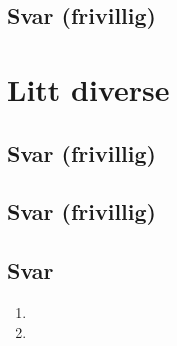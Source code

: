 \documentclass[answers,11pt]{exam}
\begin{document}
\begin{enumerate}[label=\alph*)]
  \begin{tcolorbox}
    \subsection*{Svar (frivillig)}

  \end{tcolorbox}

  \newpage
  \section*{Litt diverse}

  

  \begin{tcolorbox}
    \subsection*{Svar (frivillig)}

  \end{tcolorbox}

  \newpage
  

  \begin{tcolorbox}
    \subsection*{Svar (frivillig)}

  \end{tcolorbox}

  \newpage
  

  \begin{tcolorbox}
    \subsection*{Svar}

    \begin{enumerate}[label=o\arabic*)]
      \item

      \item


\end{enumerate}
\end{tcolorbox}
\end{enumerate}
\end{document}
